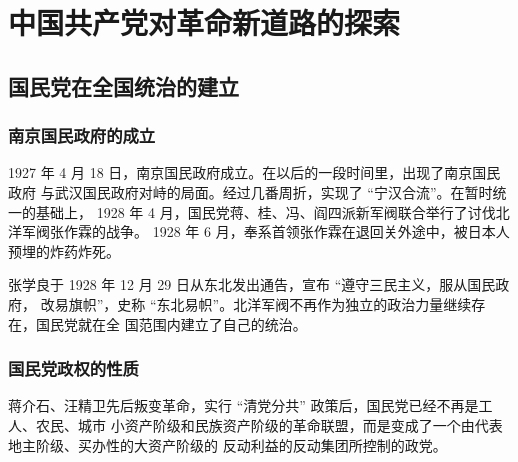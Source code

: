 \documentclass[10pt, UTF8]{ctexbook} %
\begin{document}
\section{中国共产党对革命新道路的探索}

\subsection{国民党在全国统治的建立}

\subsubsection{南京国民政府的成立}

1927 年 4 月 18 日，南京国民政府成立。在以后的一段时间里，出现了南京国民政府
与武汉国民政府对峙的局面。经过几番周折，实现了 “宁汉合流”。在暂时统一的基础上，
1928 年 4 月，国民党蒋、桂、冯、阎四派新军阀联合举行了讨伐北洋军阀张作霖的战争。
1928 年 6 月，奉系首领张作霖在退回关外途中，被日本人预埋的炸药炸死。

张学良于 1928 年 12 月 29 日从东北发出通告，宣布 “遵守三民主义，服从国民政府，
改易旗帜”，史称 “东北易帜”。北洋军阀不再作为独立的政治力量继续存在，国民党就在全
国范围内建立了自己的统治。

\subsubsection{国民党政权的性质}

蒋介石、汪精卫先后叛变革命，实行 “清党分共” 政策后，国民党已经不再是工人、农民、城市
小资产阶级和民族资产阶级的革命联盟，而是变成了一个由代表地主阶级、买办性的大资产阶级的
反动利益的反动集团所控制的政党。

\end{document}
